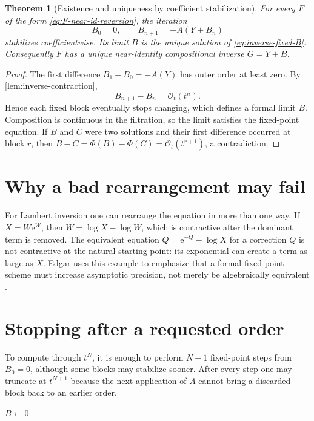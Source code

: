 \documentclass[11pt,oneside]{book}
\newtheorem{theorem}{Theorem}[chapter]
\theoremstyle{definition}
\theoremstyle{remark}
\newcommand{\e}{\mathrm e}
\newcommand{\bigO}{\mathcal O}
\newcommand{\compinv}{^{\langle-1\rangle}}
\newcommand{\compose}{\mathbin{\circ}}
\begin{document}
\begin{theorem}[Existence and uniqueness by coefficient stabilization]
\label{thm:fixed-inverse}
For every $F$ of the form \eqref{eq:F-near-id-reversion}, the iteration
\begin{equation}\label{eq:fixed-inverse-iteration}
 B_0=0,
 \qquad
 B_{n+1}=-A(Y+B_n)
\end{equation}
stabilizes coefficientwise.  Its limit $B$ is the unique solution of
\eqref{eq:inverse-fixed-B}.  Consequently $F$ has a unique near-identity
compositional inverse $G=Y+B$.
\end{theorem}
\begin{proof}
The first difference $B_1-B_0=-A(Y)$ has outer order at least zero.
By \cref{lem:inverse-contraction},
\[
 B_{n+1}-B_n=\bigO_t(t^n).
\]
Hence each fixed block eventually stops changing, which defines a formal
limit $B$.  Composition is continuous in the filtration, so the limit
satisfies the fixed-point equation.  If $B$ and $C$ were two solutions and
their first difference occurred at block $r$, then
$B-C=\Phi(B)-\Phi(C)=\bigO_t(t^{r+1})$, a contradiction.
\end{proof}

\section{Why a bad rearrangement may fail}
For Lambert inversion one can rearrange the equation in more than one way.
If $X=W\e^W$, then $W=\log X-\log W$, which is contractive after the dominant
term is removed.  The equivalent equation $Q=\e^{-Q}-\log X$ for a correction
$Q$ is not contractive at the natural starting point: its exponential can
create a term as large as $X$.  Edgar uses this example to emphasize that a
formal fixed-point scheme must increase asymptotic precision, not merely be
algebraically equivalent \cite{EdgarBeginners}.

\section{Stopping after a requested order}
To compute through $t^N$, it is enough to perform $N+1$ fixed-point steps from
$B_0=0$, although some blocks may stabilize sooner.  After every step one may
truncate at $t^{N+1}$ because the next application of $A$ cannot bring a
discarded block back to an earlier order.

\begin{algorithm}[H]
\caption{Fixed-point compositional inversion}
\label{alg:fixed-inverse}
\KwOut{$G=F\compinv\pmod{t^{N+1}}$}
$B\leftarrow0$\;
\For{$j\leftarrow0$ \KwTo $N$}{
  $B\leftarrow-\,A\compose(Y+B)\pmod{t^{N+1}}$\;
}
\;
\end{algorithm}
\end{document}
